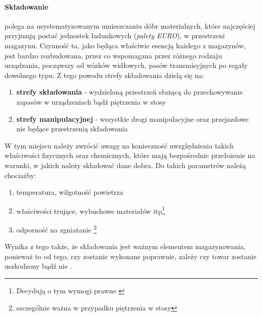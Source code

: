 		\paragraph{Składowanie} polega na usystematyzowanym umieszczaniu dóbr materialnych, które najczęściej przyjmują
		postać jednostek ładunkowych (\textit{palety EURO}), w przestrzeni magazynu. Czynność ta, jako będąca właściwie
		esencją każdego z magazynów, jest bardzo rozbudowana, przez co wspomagana przez różnego rodzaju urządzania, począwszy
		od wózków widłowych, pasów transmisyjnych po regały dowolnego typu. Z tego powodu strefy składowania dzielą się na:
		\begin{enumerate}
			\item \textbf{strefy składowania} - wydzieloną przestrzeń służącą do 
			przechowywanie zapasów w urządzeniach bądź piętrzenia w stosy
			\item \textbf{strefy manipulacyjnej} - wszystkie drogi manipulacyjne 
			oraz przejazdowe nie będące przestrzenią składowania
		\end{enumerate}	
		W tym miejscu należy zwrócić uwagę na konieczność uwzględnienia takich właściwości fizycznych oraz chemicznych, które
		mają bezpośrednie przełożenie na warunki, w jakich należy składować dane dobra. Do takich parametrów należą
		chociażby:
		\begin{enumerate}
			\item temperatura, wilgotność powietrza
			\item właściwości trujące, wybuchowe materiałów itp\footnote{Decydują o tym wymogi prawne \cite{ustawa_flamableMaterials}}
			\item odporność na zgniatanie \footnote{szczególnie ważna w przypadku piętrzenia w stosy}
		\end{enumerate}			
		Wynika z tego także, że składowania jest ważnym elementem magazynowania, ponieważ to od tego, czy zostanie
		wykonane poprawnie, zależy czy towar zostanie uszkodzony bądź nie \cite{EWSS}.
